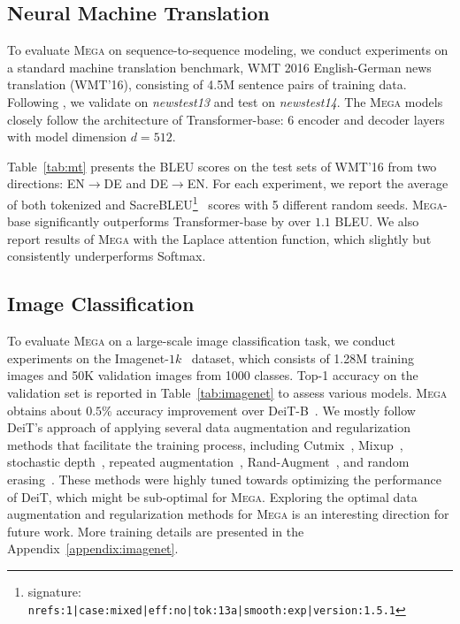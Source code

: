 \subsection{Neural Machine Translation} To evaluate \textsc{Mega} on sequence-to-sequence modeling, we conduct experiments on a standard machine translation benchmark, WMT 2016 English-German news translation (WMT'16), consisting of 4.5M sentence pairs of training data. Following \citet{ott2018scaling}, we validate on \emph{newstest13} and test on \emph{newstest14}.
The \textsc{Mega} models closely follow the architecture of Transformer-base: 6 encoder and decoder layers with model dimension $d=512$.

Table~\ref{tab:mt} presents the BLEU scores on the test sets of WMT'16 from two directions: EN$\rightarrow$DE and DE$\rightarrow$EN.
For each experiment, we report the average of both tokenized and SacreBLEU\footnote{signature: \texttt{nrefs:1|case:mixed|eff:no|tok:13a|smooth:exp|version:1.5.1}}~\citep{post-2018-call} scores with 5 different random seeds.
\textsc{Mega}-base significantly outperforms Transformer-base by over $1.1$ BLEU. We also report results of \textsc{Mega} with the Laplace attention function, which slightly but consistently underperforms Softmax. 

\subsection{Image Classification} To evaluate \textsc{Mega} on a large-scale image classification task, we conduct experiments on the Imagenet-$1k$~\citep{deng2009imagenet} dataset, which consists of 1.28M training images and 50K validation images from 1000 classes. Top-1 accuracy on the validation set is reported in Table~\ref{tab:imagenet} to assess various models.
\textsc{Mega} obtains about $0.5$\% accuracy improvement over DeiT-B~\citep{touvron2021training}. We mostly follow DeiT's approach of applying several data augmentation and regularization methods that facilitate the training process, including Cutmix~\citep{yun2019cutmix}, Mixup~\citep{zhang2017mixup}, stochastic depth~\citep{huang2016deep}, repeated augmentation~\citep{hoffer2020augment}, Rand-Augment~\citep{cubuk2020randaugment}, and random erasing~\citep{zhong2020random}. These methods were highly tuned towards optimizing the performance of DeiT, which might be sub-optimal for \textsc{Mega}. 
Exploring the optimal data augmentation and regularization methods for \textsc{Mega} is an interesting direction for future work. More training details are presented in the Appendix~\ref{appendix:imagenet}. 

